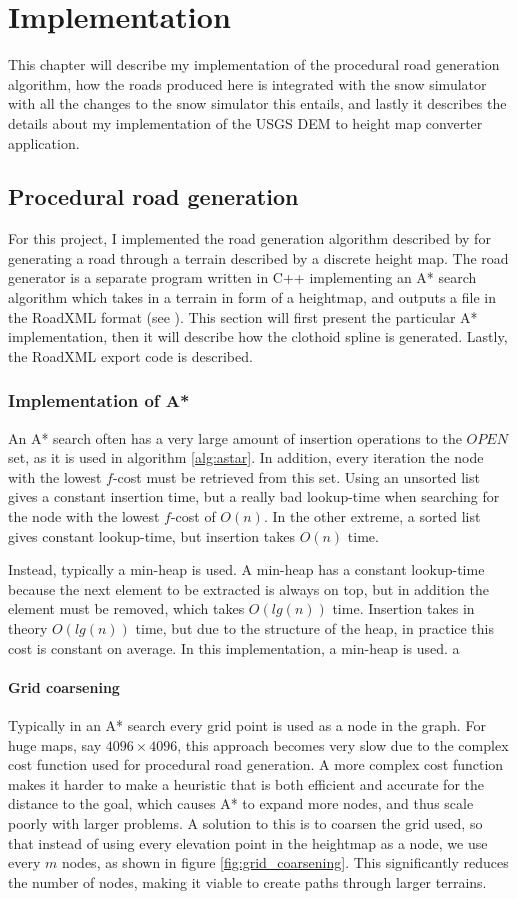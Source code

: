 \chapter{Implementation}
This chapter will describe my implementation of the procedural road generation algorithm, how the roads produced here is integrated with the snow simulator with all the changes to the snow simulator this entails, and lastly it describes the details about my implementation of the USGS DEM to height map converter application.

\section{Procedural road generation}
For this project, I implemented the road generation algorithm described by \cite{roadgen} for generating a road through a terrain described by a discrete height map. The road generator is a separate program written in C++ implementing an A* search algorithm which takes in a terrain in form of a heightmap, and outputs a file in the RoadXML format (see \cite{roadxml}). This section will first present the particular A* implementation, then it will describe how the clothoid spline is generated. Lastly, the RoadXML export code is described.

\subsection{Implementation of A*}
An A* search often has a very large amount of insertion operations to the $OPEN$ set, as it is used in algorithm \ref{alg:astar}. In addition, every iteration the node with the lowest $f$-cost must be retrieved from this set. Using an unsorted list gives a constant insertion time, but a really bad lookup-time when searching for the node with the lowest $f$-cost of $O(n)$. In the other extreme, a sorted list gives constant lookup-time, but insertion takes $O(n)$ time. 

Instead, typically a min-heap is used. A min-heap has a constant lookup-time because the next element to be extracted is always on top, but in addition the element must be removed, which takes $O(lg(n))$ time. Insertion takes in theory $O(lg(n))$ time, but due to the structure of the heap, in practice this cost is constant on average. In this implementation, a min-heap is used. 
a
\subsubsection{Grid coarsening}
Typically in an A* search every grid point is used as a node in the graph. For huge maps, say $4096\times 4096$, this approach becomes very slow due to the complex cost function used for procedural road generation. A more complex cost function makes it harder to make a heuristic that is both efficient and accurate for the distance to the goal, which causes A* to expand more nodes, and thus scale poorly with larger problems. A solution to this is to coarsen the grid used, so that instead of using every elevation point in the heightmap as a node, we use every $m$ nodes, as shown in figure \ref{fig:grid_coarsening}. This significantly reduces the number of nodes, making it viable to create paths through larger terrains.

